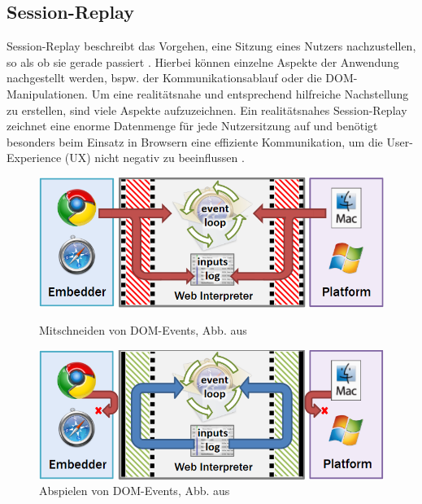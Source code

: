 \subsection{Session-Replay}

Session-Replay beschreibt das Vorgehen, eine Sitzung eines Nutzers nachzustellen, so als ob sie gerade passiert \cite{NoBoundariesExfiltrationBySessionReplayScripts}. Hierbei können einzelne Aspekte der Anwendung nachgestellt werden, bspw. der Kommunikationsablauf oder die DOM-Manipulationen. Um eine realitätsnahe und entsprechend hilfreiche Nachstellung zu erstellen, sind viele Aspekte aufzuzeichnen. Ein realitätsnahes Session-Replay zeichnet eine enorme Datenmenge für jede Nutzersitzung auf und benötigt besonders beim Einsatz in Browsern eine effiziente Kommunikation, um die User-Experience (UX) nicht negativ zu beeinflussen \cite{AdvancedWebAnalyticsToolForMouseTracking} \cite{LogRocketPerformance}.

\begin{figure}
\vspace{-2.0\baselineskip}
\centering
\includegraphics[width=\linewidth]{img/03_methoden/timelapse_figure5.png}
\caption{Mitschneiden von DOM-Events, Abb. aus \cite{TimelapsePaper}}
\label{fig:timelapse_figure5}
\smallskip\par
\includegraphics[width=\linewidth]{img/03_methoden/timelapse_figure6.png}
\caption{Abspielen von DOM-Events, Abb. aus \cite{TimelapsePaper}}
\label{fig:timelapse_figure6}
\end{figure}

